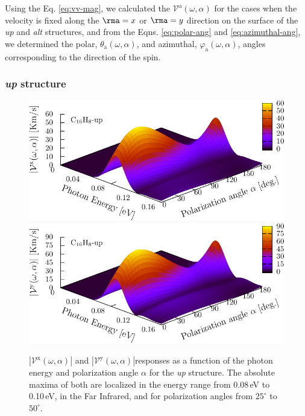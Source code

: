 \documentclass[prb,11pt,tightenlines,twocolumn,aps]{revtex4-1}
\begin{document}
 Using the Eq. \eqref{eq:vv-mag}, we calculated the
$\mathcal{V}^{\mathrm{a}} (\omega,\alpha)$ for the cases when the velocity is
fixed along the $\rma=x$ or $\rma=y$ direction on the surface of the \emph{up} and
\emph{alt} structures, and from the Eqns. \eqref{eq:polar-ang} and 
\eqref{eq:azimuthal-ang}, we determined the polar, $\theta_{\mathrm{a}}
(\omega,\alpha)$, and azimuthal, $\varphi_{\mathrm{a}} (\omega,\alpha)$, angles
corresponding to the direction of the spin.

\subsubsection{{\it up} structure}

\begin{figure}[t]
    \centering
    \includegraphics[width=\linewidth]{upplots/up-3d-vxb-1}
    \\
    \includegraphics[width=\linewidth]{upplots/up-3d-vyb-1}
    
    \caption{ $|\mathcal{V}^{\mathrm{x}}(\omega,\alpha)|$ and
    $|\mathcal{V}^{\mathrm{y}}(\omega,\alpha)|$responses as a function of the
    photon energy and polarization angle $\alpha$ for the \emph{up} structure.
    The absolute maxima of both are localized in the energy range from 0.08\,eV
    to 0.10\,eV, in the Far  Infrared, and for polarization angles from
    $25^{\circ}$ to $50^{\circ}$.}
    \label{fig:up-3d-vva-1}
\end{figure}
\end{document}
